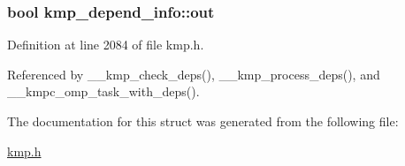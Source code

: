 \hypertarget{structkmp__depend__info_ad2f4d34c0d6aa127073c9e21a5041244}{
\subsubsection[{out}]{\setlength{\rightskip}{0pt plus 5cm}bool kmp\-\_\-depend\-\_\-info\-::out}}\label{structkmp__depend__info_ad2f4d34c0d6aa127073c9e21a5041244}


Definition at line 2084 of file kmp.\-h.



Referenced by \-\_\-\-\_\-kmp\-\_\-check\-\_\-deps(), \-\_\-\-\_\-kmp\-\_\-process\-\_\-deps(), and \-\_\-\-\_\-kmpc\-\_\-omp\-\_\-task\-\_\-with\-\_\-deps().



The documentation for this struct was generated from the following file\-:\begin{DoxyCompactItemize}
\item 
\hyperlink{kmp_8h}{kmp.\-h}\end{DoxyCompactItemize}
